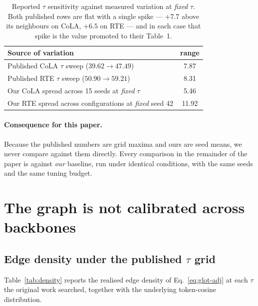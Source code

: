 \documentclass{article} %
\begin{document}
\begin{table}[t]
\caption{Reported $\tau$ sensitivity against measured variation at
\emph{fixed} $\tau$. Both published rows are flat with a single spike --- $+7.7$
above its neighbours on CoLA, $+6.5$ on RTE --- and in each case that spike is
the value promoted to their Table~1.}
\label{tab:tau-noise}
\begin{center}
\begin{tabular}{lc}
\toprule
Source of variation & range \\
\midrule
Published CoLA $\tau$ sweep ($39.62 \rightarrow 47.49$) & 7.87 \\
Published RTE $\tau$ sweep ($50.90 \rightarrow 59.21$)  & 8.31 \\
\midrule
Our CoLA spread across 15 seeds at \emph{fixed} $\tau$   & 5.46 \\
Our RTE spread across configurations at \emph{fixed} seed 42 & 11.92 \\
\bottomrule
\end{tabular}
\end{center}
\end{table}

\paragraph{Consequence for this paper.} Because the published numbers are grid
maxima and ours are seed means, we never compare against them directly. Every
comparison in the remainder of the paper is against \emph{our} baseline, run
under identical conditions, with the same seeds and the same tuning budget.

\section{The graph is not calibrated across backbones}
\label{sec:calibration}

\subsection{Edge density under the published $\tau$ grid}

Table~\ref{tab:density} reports the realised edge density of
Eq.~\ref{eq:glot-adj} at each $\tau$ the original work searched, together with
the underlying token-cosine distribution.
\end{document}
